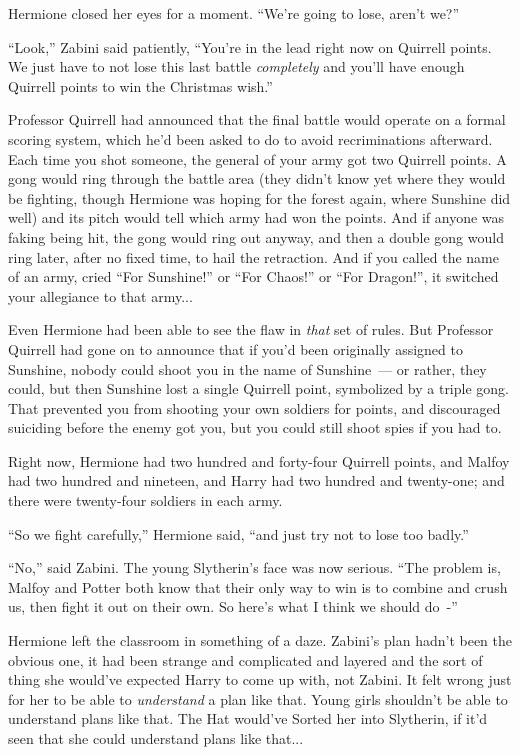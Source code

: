 Hermione closed her eyes for a moment. ``We're going to lose, aren't we?''

``Look,'' Zabini said patiently, ``You're in the lead right now on Quirrell points. We just have to not lose this last battle \emph{completely} and you'll have enough Quirrell points to win the Christmas wish.''

Professor Quirrell had announced that the final battle would operate on a formal scoring system, which he'd been asked to do to avoid recriminations afterward. Each time you shot someone, the general of your army got two Quirrell points. A gong would ring through the battle area (they didn't know yet where they would be fighting, though Hermione was hoping for the forest again, where Sunshine did well) and its pitch would tell which army had won the points. And if anyone was faking being hit, the gong would ring out anyway, and then a double gong would ring later, after no fixed time, to hail the retraction. And if you called the name of an army, cried ``For Sunshine!'' or ``For Chaos!'' or ``For Dragon!'', it switched your allegiance to that army...

Even Hermione had been able to see the flaw in \emph{that} set of rules. But Professor Quirrell had gone on to announce that if you'd been originally assigned to Sunshine, nobody could shoot you in the name of Sunshine~--- or rather, they could, but then Sunshine lost a single Quirrell point, symbolized by a triple gong. That prevented you from shooting your own soldiers for points, and discouraged suiciding before the enemy got you, but you could still shoot spies if you had to.

Right now, Hermione had two hundred and forty-four Quirrell points, and Malfoy had two hundred and nineteen, and Harry had two hundred and twenty-one; and there were twenty-four soldiers in each army.

``So we fight carefully,'' Hermione said, ``and just try not to lose too badly.''

``No,'' said Zabini. The young Slytherin's face was now serious. ``The problem is, Malfoy and Potter both know that their only way to win is to combine and crush us, then fight it out on their own. So here's what I think we should do~-''

Hermione left the classroom in something of a daze. Zabini's plan hadn't been the obvious one, it had been strange and complicated and layered and the sort of thing she would've expected Harry to come up with, not Zabini. It felt wrong just for her to be able to \emph{understand} a plan like that. Young girls shouldn't be able to understand plans like that. The Hat would've Sorted her into Slytherin, if it'd seen that she could understand plans like that...

